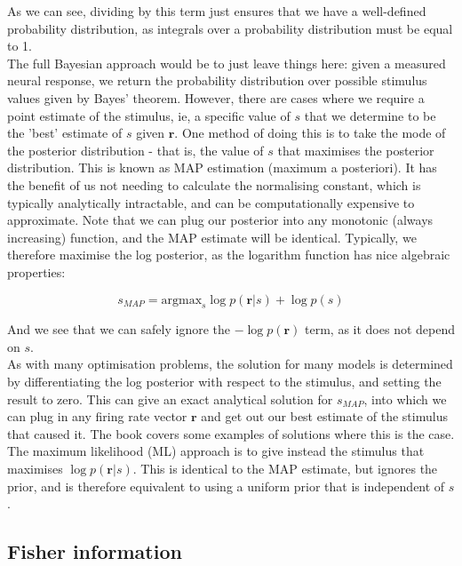 \documentclass{article}
\begin{document}
As we can see, dividing by this term just ensures that we have a well-defined probability distribution, as integrals over a probability distribution must be equal to 1.\\

The full Bayesian approach would be to just leave things here: given a measured neural response, we return the probability distribution over possible stimulus values given by Bayes' theorem. However, there are cases where we require a point estimate of the stimulus, ie, a specific value of $s$ that we determine to be the 'best' estimate of $s$ given $\bm{r}$. One method of doing this is to take the mode of the posterior distribution - that is, the value of $s$ that maximises the posterior distribution. This is known as MAP estimation (maximum a posteriori). It has the benefit of us not needing to calculate the normalising constant, which is typically analytically intractable, and can be computationally expensive to approximate. Note that we can plug our posterior into any monotonic (always increasing) function, and the MAP estimate will be identical. Typically, we therefore maximise the log posterior, as the logarithm function has nice algebraic properties:

\begin{equation*}
    s_{MAP} = \text{argmax}_s \log p(\bm{r}|s) + \log p(s)
\end{equation*}

And we see that we can safely ignore the $-\log p(\bm{r})$ term, as it does not depend on $s$.\\

As with many optimisation problems, the solution for many models is determined by differentiating the log posterior with respect to the stimulus, and setting the result to zero. This can give an exact analytical solution for $s_{MAP}$, into which we can plug in any firing rate vector $\bm{r}$ and get out our best estimate of the stimulus that caused it. The book covers some examples of solutions where this is the case.\\

The maximum likelihood (ML) approach is to give instead the stimulus that maximises $\log p(\bm{r}|s)$. This is identical to the MAP estimate, but ignores the prior, and is therefore equivalent to using a uniform prior that is independent of $s$.

\subsection{Fisher information}
\end{document}
